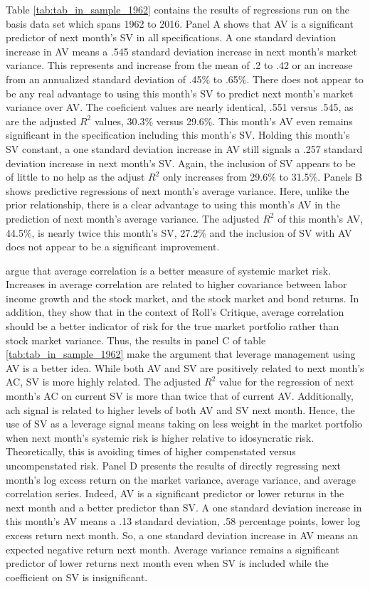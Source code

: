 Table \ref{tab:tab_in_sample_1962} contains the results of regressions run on the basis data set which spans 1962 to 2016. Panel A shows that AV is a significant predictor of next month's SV in all specifications. A one standard deviation increase in AV means a .545 standard deviation increase in next month's market variance. This represents and increase from the mean of .2 to .42 or an increase from an annualized standard deviation of .45\% to .65\%. There does not appear to be any real advantage to using this month's SV to predict next month's market variance over AV. The coeficient values are nearly identical, .551 versus .545, as are the adjusted $R^{2}$ values, 30.3\% versus 29.6\%. This month's AV even remains significant in the specification including this month's SV. Holding this month's SV constant, a one standard deviation increase in AV still signals a .257 standard deviation increase in next month's SV. Again, the inclusion of SV appears to be of little to no help as the adjust $R^{2}$ only increases from 29.6\% to 31.5\%. Panels B shows predictive regressions of next month's average variance. Here, unlike the prior relationship, there is a clear advantage to using this month's AV in the prediction of next month's average variance. The adjusted $R^{2}$ of this month's AV, 44.5\%, is nearly twice this month's SV, 27.2\% and the inclusion of SV with AV does not appear to be a significant improvement.

\citet{pollet_average_2010} argue that average correlation is a better measure of systemic market risk. Increases in average correlation are related to higher covariance between labor income growth and the stock market, and the stock market and bond returns. In addition, they show that in the context of Roll's Critique, average correlation should be a better indicator of risk for the true market portfolio rather than stock market variance. \citep{roll_critique_1977} Thus, the results in panel C of table \ref{tab:tab_in_sample_1962} make the argument that leverage management using AV is a better idea. While both AV and SV are positively related to next month's AC, SV is more highly related. The adjusted $R^{2}$ value for the regression of next month's AC on current SV is more than twice that of current AV. Additionally, ach signal is related to higher levels of both AV and SV next month. Hence, the use of SV as a leverage signal means taking on less weight in the market portfolio when next month's systemic risk is higher relative to idosyncratic risk. Theoretically, this is avoiding times of higher compenstated versus uncompenstated risk. Panel D presents the results of directly regressing next month's log excess return on the market variance, average variance, and average correlation series. Indeed, AV is a significant predictor or lower returns in the next month and a better predictor than SV. A one standard deviation increase in this month's AV means a .13 standard deviation, .58 percentage points, lower log excess return next month. So, a one standard deviation increase in AV means an expected negative return next month. Average variance remains a significant predictor of lower returns next month even when SV is included while the coefficient on SV is insignificant.

